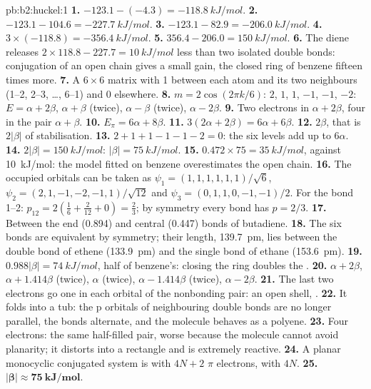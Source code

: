 \begin{solution}{pb:b2:huckel:1}
\textbf{1.} $-123.1 - (-4.3) = \qty{-118.8}{kJ/mol}$.
\textbf{2.} $-123.1 - 104.6 = \qty{-227.7}{kJ/mol}$.
\textbf{3.} $-123.1 - 82.9 = \qty{-206.0}{kJ/mol}$.
\textbf{4.} $3 \times (-118.8) = \qty{-356.4}{kJ/mol}$.
\textbf{5.} $356.4 - 206.0 = \qty{150}{kJ/mol}$.
\textbf{6.} The diene releases $2 \times 118.8 - 227.7 = \qty{10}{kJ/mol}$ less than two
isolated double bonds: conjugation of an open chain gives a small gain, the closed
ring of benzene fifteen times more.
\textbf{7.} A $6 \times 6$ matrix with 1 between each atom and its two neighbours (1--2, 2--3,
\dots, 6--1) and 0 elsewhere.
\textbf{8.} $m = 2\cos(2\pi k/6)$: $2$, $1$, $1$, $-1$, $-1$, $-2$: $E = \alpha + 2\beta$, $\alpha + \beta$ (twice),
$\alpha - \beta$ (twice), $\alpha - 2\beta$.
\textbf{9.} Two electrons in $\alpha + 2\beta$, four in the pair $\alpha + \beta$.
\textbf{10.} $E_\pi = 6\alpha + 8\beta$.
\textbf{11.} $3(2\alpha + 2\beta) = 6\alpha + 6\beta$.
\textbf{12.} $2\beta$, that is $2|\beta|$ of stabilisation.
\textbf{13.} $2 + 1 + 1 - 1 - 1 - 2 = 0$: the six levels add up to $6\alpha$.
\textbf{14.} $2|\beta| = \qty{150}{kJ/mol}$: $|\beta| = \qty{75}{kJ/mol}$.
\textbf{15.} $0.472 \times 75 = \qty{35}{kJ/mol}$, against \qty{10}{kJ/mol}: the model fitted
on benzene overestimates the open chain.
\textbf{16.} The occupied orbitals can be taken as $\psi_1 = (1, 1, 1, 1, 1, 1)/\sqrt6$,
$\psi_2 = (2, 1, -1, -2, -1, 1)/\sqrt{12}$ and $\psi_3 = (0, 1, 1, 0, -1, -1)/2$. For the bond
1--2: $p_{12} = 2(\frac16 + \frac{2}{12} + 0) = \frac23$; by symmetry every bond has $p = 2/3$.
\textbf{17.} Between the end (0.894) and central (0.447) bonds of butadiene.
\textbf{18.} The six bonds are equivalent by symmetry; their length, \qty{139.7}{pm}, lies
between the double bond of ethene (\qty{133.9}{pm}) and the single bond of ethane
(\qty{153.6}{pm}).
\textbf{19.} $0.988|\beta| = \qty{74}{kJ/mol}$, half of benzene's: closing the ring doubles the
.
\textbf{20.} $\alpha + 2\beta$, $\alpha + 1.414\beta$ (twice), $\alpha$ (twice), $\alpha - 1.414\beta$ (twice),
$\alpha - 2\beta$.
\textbf{21.} The last two electrons go one in each orbital of the nonbonding pair: an open
shell, .
\textbf{22.} It folds into a tub: the p orbitals of neighbouring double bonds are no longer
parallel, the bonds alternate, and the molecule behaves as a polyene.
\textbf{23.} Four electrons: the same half-filled pair, worse because the molecule cannot
avoid planarity; it distorts into a rectangle and is extremely reactive.
\textbf{24.} A planar monocyclic conjugated system is  with $4N + 2$ $\pi$ electrons,
 with $4N$.
\textbf{25.} $\boldsymbol{|\beta| \approx \qty{75}{kJ/mol}}$.
\end{solution}
